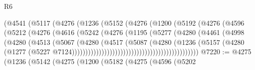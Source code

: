 \begin{lexlean}{R6}
\begin{coremodule}
                                  (@4541
                                    (@5117
                                      (@4276
                                        (@1236
                                          (@5152
                                            (@4276
                                              (@1200
                                                (@5192
                                                  (@4276
                                                    (@4596
                                                      (@5212
                                                        (@4276
                                                          (@4616
                                                            (@5242
                                                              (@4276
                                                                (@1195
                                                                  (@5277
                                                                    (@4280
                                                                      (@4461
                                                                        (@4998
                                                                          (@4280
                                                                            (@4513
                                                                              (@5067
                                                                                (@4280
                                                                                  (@4517
                                                                                    (@5087
                                                                                      (@4280
                                                                                        (@1236
                                                                                          (@5157
                                                                                            (@4280
                                                                                              (@1277
                                                                                                (@5227
                                                                                                  @7124)))))))))))))))))))))))))))))))))))))))))))))))
@7220 := @4275
    (@1236
      (@5142
        (@4275
          (@1200
            (@5182
              (@4275
                (@4596
                  (@5202

\end{coremodule}
\end{lexlean}
